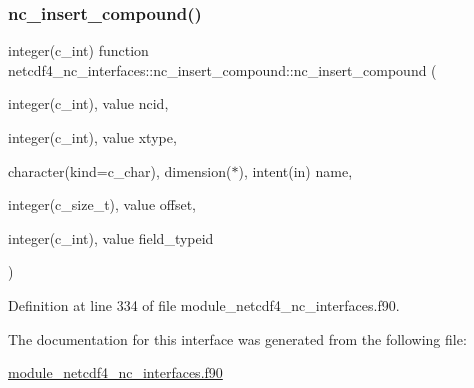 \subsubsection{\texorpdfstring{nc\+\_\+insert\+\_\+compound()}{nc\_insert\_compound()}}
{\footnotesize\ttfamily integer(c\+\_\+int) function netcdf4\+\_\+nc\+\_\+interfaces\+::nc\+\_\+insert\+\_\+compound\+::nc\+\_\+insert\+\_\+compound (\begin{DoxyParamCaption}\item[{integer(c\+\_\+int), value}]{ncid,  }\item[{integer(c\+\_\+int), value}]{xtype,  }\item[{character(kind=c\+\_\+char), dimension($\ast$), intent(in)}]{name,  }\item[{integer(c\+\_\+size\+\_\+t), value}]{offset,  }\item[{integer(c\+\_\+int), value}]{field\+\_\+typeid }\end{DoxyParamCaption})}



Definition at line 334 of file module\+\_\+netcdf4\+\_\+nc\+\_\+interfaces.\+f90.



The documentation for this interface was generated from the following file\+:\begin{DoxyCompactItemize}
\item 
\hyperlink{module__netcdf4__nc__interfaces_8f90}{module\+\_\+netcdf4\+\_\+nc\+\_\+interfaces.\+f90}\end{DoxyCompactItemize}
